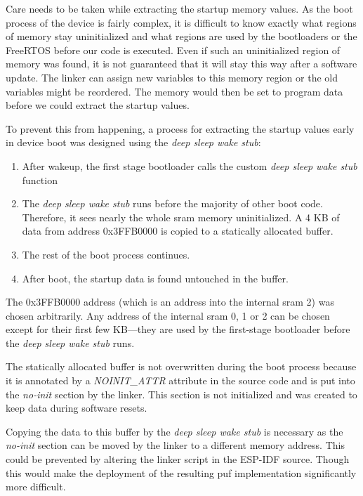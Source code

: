 Care needs to be taken while extracting the startup memory values. As the boot process of the device is fairly complex, it is difficult to know exactly what regions of memory stay uninitialized and what regions are used by the bootloaders or the FreeRTOS before our code is executed. Even if such an uninitialized region of memory was found, it is not guaranteed that it will stay this way after a software update. The linker can assign new variables to this memory region or the old variables might be reordered. The memory would then be set to program data before we could extract the startup values.

To prevent this from happening, a process for extracting the startup values early in device boot was designed using the \emph{deep sleep wake stub}:

\begin{enumerate}
    \item After wakeup, the first stage bootloader calls the custom \emph{deep sleep wake stub} function
    \item The \emph{deep sleep wake stub} runs before the majority of other boot code. Therefore, it sees nearly the whole \gls{sram} memory uninitialized. A 4 KB of data from address 0x3FFB0000 is copied to a statically allocated buffer.
    \item The rest of the boot process continues.
    \item After boot, the startup data is found untouched in the buffer.
\end{enumerate}

The 0x3FFB0000 address (which is an address into the internal \gls{sram} 2) was chosen arbitrarily. Any address of the internal \gls{sram} 0, 1 or 2 can be chosen except for their first few KB---they are used by the first-stage bootloader before the \emph{deep sleep wake stub} runs.

The statically allocated buffer is not overwritten during the boot process because it is annotated by a \emph{NOINIT\_ATTR} attribute in the source code and is put into the \emph{no-init} section by the linker. This section is not initialized and was created to keep data during software resets.\cite{espidf2022}

Copying the data to this buffer by the \emph{deep sleep wake stub} is necessary as the \emph{no-init} section can be moved by the linker to a different memory address. This could be prevented by altering the linker script in the ESP-IDF source. Though this would make the deployment of the resulting \gls{puf} implementation significantly more difficult.


